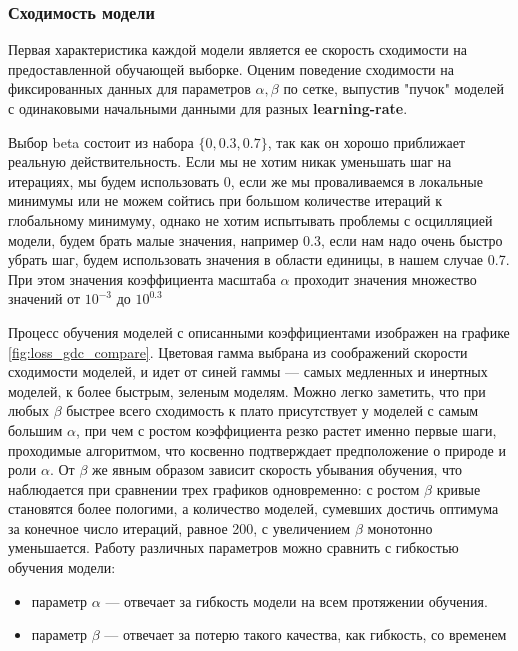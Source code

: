 \documentclass{article}
\begin{document}
    \subsubsection{Сходимость модели}

    
        Первая характеристика каждой модели является ее скорость сходимости на предоставленной обучающей выборке. Оценим поведение сходимости на фиксированных данных для параметров $\alpha, \beta$ по сетке, выпустив "пучок" моделей с одинаковыми начальными данными для разных \textbf{learning-rate}.

        Выбор beta состоит из набора $\{0, 0.3, 0.7\}$, так как он хорошо приближает реальную действительность. Если мы не хотим никак уменьшать шаг на итерациях, мы будем использовать 0, если же мы проваливаемся в локальные минимумы или не можем сойтись при большом количестве итераций к глобальному минимуму, однако не хотим испытывать проблемы с осцилляцией модели, будем брать малые значения, например 0.3, если нам надо очень быстро убрать шаг, будем использовать значения в области единицы, в нашем случае 0.7. При этом значения коэффициента масштаба $\alpha$ проходит значения множество значений от ${10}^{-3}$ до ${10}^{0.3}$
        
        Процесс обучения моделей с описанными коэффициентами изображен на графике \ref{fig:loss_gdc_compare}. Цветовая гамма выбрана из соображений скорости сходимости моделей, и идет от синей гаммы — самых медленных и инертных моделей, к более быстрым, зеленым моделям. Можно легко заметить, что при любых $\beta$ быстрее всего сходимость к плато присутствует у моделей с самым большим $\alpha$, при чем с ростом коэффициента резко растет именно первые шаги, проходимые алгоритмом, что косвенно подтверждает предположение о природе и роли $\alpha$. От $\beta$ же явным образом зависит скорость убывания обучения, что наблюдается при сравнении трех графиков одновременно: с ростом $\beta$ кривые становятся более пологими, а количество моделей, сумевших достичь оптимума за конечное число итераций, равное 200, с увеличением $\beta$ монотонно уменьшается. Работу различных параметров можно сравнить с гибкостью обучения модели:
        
        \begin{itemize}
            \item параметр $\alpha$ — отвечает за гибкость модели на всем протяжении обучения.
            \item параметр $\beta$ — отвечает за потерю такого качества, как гибкость, со временем
        \end{itemize}
\end{document}
